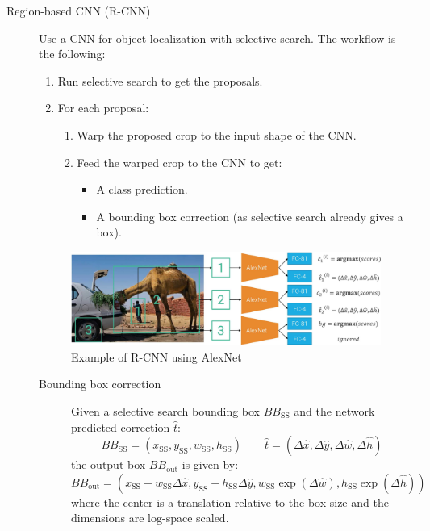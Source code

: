 \begin{description}
    \item[Region-based CNN (R-CNN)] 
        Use a CNN for object localization with selective search. The workflow is the following:
        \begin{enumerate}
            \item Run selective search to get the proposals.
            \item For each proposal:
            \begin{enumerate}
                \item Warp the proposed crop to the input shape of the CNN.
                \item Feed the warped crop to the CNN to get:
                \begin{itemize}
                    \item A class prediction.
                    \item A bounding box correction (as selective search already gives a box).
                \end{itemize}
            \end{enumerate}
        \end{enumerate}

        \begin{figure}[H]
            \centering
            \includegraphics[width=0.8\linewidth]{./img/_r_cnn.jpg}
            \caption{Example of R-CNN using AlexNet}
        \end{figure}

        \begin{description}
            \item[Bounding box correction] 
                Given a selective search bounding box $BB_{\text{SS}}$ and the network predicted correction $\hat{t}$:
                \[ 
                    BB_{\text{SS}} = (x_{\text{SS}}, y_{\text{SS}}, w_{\text{SS}}, h_{\text{SS}})
                    \qquad
                    \hat{t} = (\Delta\hat{x}, \Delta\hat{y}, \Delta\hat{w}, \Delta\hat{h})
                \]
                the output box $BB_{\text{out}}$ is given by:
                \[ 
                    BB_{\text{out}} = ( 
                        x_{\text{SS}} + w_{\text{SS}}\Delta\hat{x},
                        y_{\text{SS}} + h_{\text{SS}}\Delta\hat{y},
                        w_{\text{SS}} \exp(\Delta\hat{w}),
                        h_{\text{SS}} \exp(\Delta\hat{h})
                    ) 
                \]
                where the center is a translation relative to the box size and the dimensions are log-space scaled.


\end{description}
\end{description}
